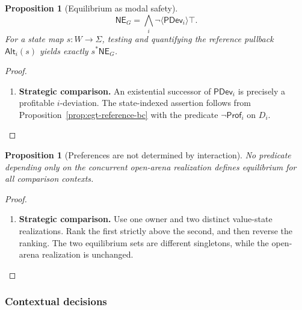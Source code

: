 \documentclass[11pt,a4paper]{article}
\numberwithin{equation}{section}
\newtheorem{proposition}[theorem]{Proposition}
\theoremstyle{definition}
\theoremstyle{remark}
\theoremstyle{plain}
\begin{document}
\begin{proposition}[Equilibrium as modal safety]
\label{prop:egt-ne-modal-safety}
\begin{equation}\label{eq:egt-ne-modal-safety}
 \mathsf{NE}_G=\bigwedge_i\neg\langle\mathsf{PDev}_i\rangle\top.
\end{equation}
For a state map $s:W\to\Sigma$, testing and quantifying the reference
pullback $\mathsf{Alt}_i(s)$ yields exactly $s^*\mathsf{NE}_G$.
\end{proposition}
\begin{proof}
\leavevmode
\begin{enumerate}[label=\textup{(\arabic*)},leftmargin=*,itemsep=4pt,topsep=3pt]
  \item \textbf{Strategic comparison.} An existential successor of $\mathsf{PDev}_i$ is precisely a profitable
$i$-deviation. The state-indexed assertion follows from
Proposition~\ref{prop:egt-reference-bc} with the predicate
$\neg\mathsf{Prof}_i$ on $D_i$.
\end{enumerate}
\end{proof}

\begin{proposition}[Preferences are not determined by interaction]
No predicate depending only on the concurrent open-arena realization defines
equilibrium for all comparison contexts.
\end{proposition}
\begin{proof}
\leavevmode
\begin{enumerate}[label=\textup{(\arabic*)},leftmargin=*,itemsep=4pt,topsep=3pt]
  \item \textbf{Strategic comparison.} Use one owner and two distinct value-state realizations. Rank the first
strictly above the second, and then reverse the ranking. The two equilibrium
sets are different singletons, while the open-arena realization is unchanged.
\end{enumerate}
\end{proof}

\subsubsection{Contextual decisions}
\end{document}
